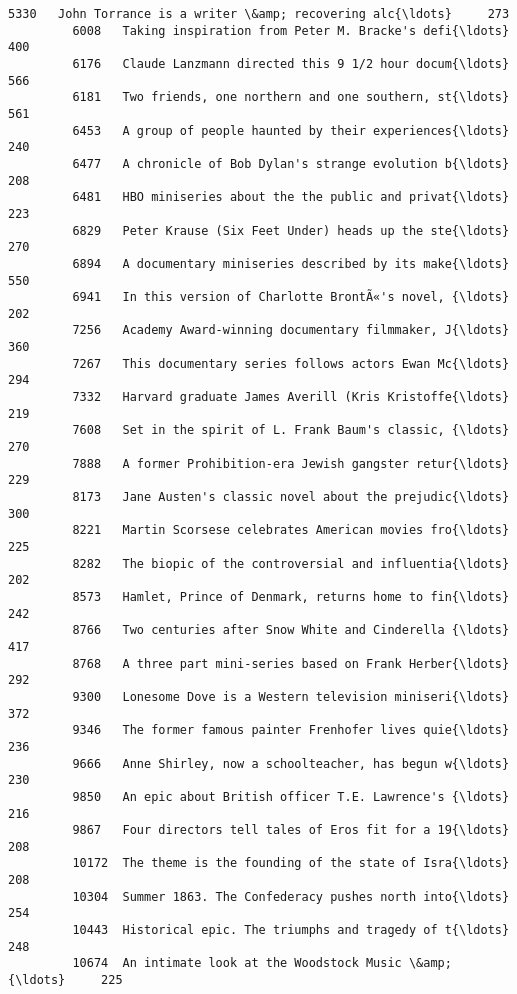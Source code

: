 \documentclass[11pt]{article}
\begin{document}
\begin{Verbatim}[commandchars=\\\{\}]
         5330   John Torrance is a writer \&amp; recovering alc{\ldots}     273   
         6008   Taking inspiration from Peter M. Bracke's defi{\ldots}     400   
         6176   Claude Lanzmann directed this 9 1/2 hour docum{\ldots}     566   
         6181   Two friends, one northern and one southern, st{\ldots}     561   
         6453   A group of people haunted by their experiences{\ldots}     240   
         6477   A chronicle of Bob Dylan's strange evolution b{\ldots}     208   
         6481   HBO miniseries about the the public and privat{\ldots}     223   
         6829   Peter Krause (Six Feet Under) heads up the ste{\ldots}     270   
         6894   A documentary miniseries described by its make{\ldots}     550   
         6941   In this version of Charlotte BrontÃ«'s novel, {\ldots}     202   
         7256   Academy Award-winning documentary filmmaker, J{\ldots}     360   
         7267   This documentary series follows actors Ewan Mc{\ldots}     294   
         7332   Harvard graduate James Averill (Kris Kristoffe{\ldots}     219   
         7608   Set in the spirit of L. Frank Baum's classic, {\ldots}     270   
         7888   A former Prohibition-era Jewish gangster retur{\ldots}     229   
         8173   Jane Austen's classic novel about the prejudic{\ldots}     300   
         8221   Martin Scorsese celebrates American movies fro{\ldots}     225   
         8282   The biopic of the controversial and influentia{\ldots}     202   
         8573   Hamlet, Prince of Denmark, returns home to fin{\ldots}     242   
         8766   Two centuries after Snow White and Cinderella {\ldots}     417   
         8768   A three part mini-series based on Frank Herber{\ldots}     292   
         9300   Lonesome Dove is a Western television miniseri{\ldots}     372   
         9346   The former famous painter Frenhofer lives quie{\ldots}     236   
         9666   Anne Shirley, now a schoolteacher, has begun w{\ldots}     230   
         9850   An epic about British officer T.E. Lawrence's {\ldots}     216   
         9867   Four directors tell tales of Eros fit for a 19{\ldots}     208   
         10172  The theme is the founding of the state of Isra{\ldots}     208   
         10304  Summer 1863. The Confederacy pushes north into{\ldots}     254   
         10443  Historical epic. The triumphs and tragedy of t{\ldots}     248   
         10674  An intimate look at the Woodstock Music \&amp; {\ldots}     225   
         

\end{Verbatim}
\end{document}
